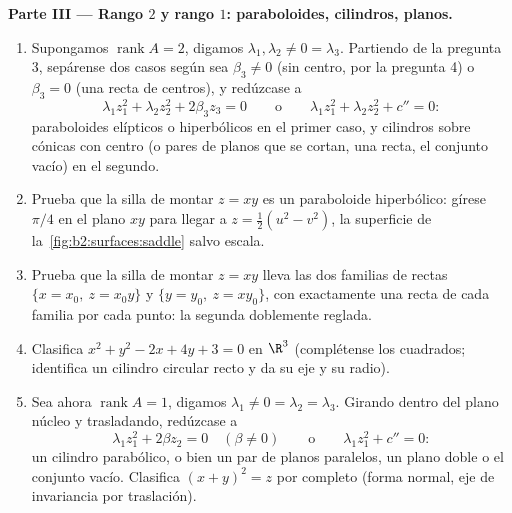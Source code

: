 \begin{problem}
\medskip
\noindent\textbf{Parte III --- Rango $2$ y rango $1$: paraboloides,
cilindros, planos.}
\begin{enumerate}[resume]
  \item Supongamos $\operatorname{rank}A = 2$, digamos $\lambda_1,
        \lambda_2 \neq 0 = \lambda_3$. Partiendo de la pregunta 3,
        sepárense dos casos según sea $\beta_3 \neq 0$ (sin centro,
        por la pregunta 4) o $\beta_3 = 0$ (una recta de centros), y
        redúzcase a
        \[
        \lambda_1z_1^2 + \lambda_2z_2^2 + 2\beta_3z_3 = 0
        \qquad\text{o}\qquad
        \lambda_1z_1^2 + \lambda_2z_2^2 + c'' = 0 :
        \]
        paraboloides elípticos o hiperbólicos en el primer caso, y
        cilindros sobre cónicas con centro (o pares de planos que se
        cortan, una recta, el conjunto vacío) en el segundo.
  \item Prueba que la silla de montar $z = xy$ es un paraboloide
        hiperbólico: gírese $\pi/4$ en el plano $xy$ para llegar a $z
        = \tfrac12(u^2 - v^2)$, la superficie de la~\cref{fig:b2:surfaces:saddle} salvo escala.
  \item Prueba que la silla de montar $z = xy$ lleva las dos familias
        de rectas $\{x = x_0,\ z = x_0y\}$ y $\{y = y_0,\ z =
        xy_0\}$, con exactamente una recta de cada familia por cada
        punto: la segunda  doblemente reglada.
  \item Clasifica $x^2 + y^2 - 2x + 4y + 3 = 0$ en $\R^3$ (complétense
        los cuadrados; identifica un cilindro circular recto y da su
        eje y su radio).
  \item Sea ahora $\operatorname{rank}A = 1$, digamos $\lambda_1 \neq
        0 = \lambda_2 = \lambda_3$. Girando dentro del plano núcleo y
        trasladando, redúzcase a
        \[
        \lambda_1z_1^2 + 2\beta z_2 = 0 \quad (\beta \neq 0)
        \qquad\text{o}\qquad
        \lambda_1z_1^2 + c'' = 0 :
        \]
        un cilindro parabólico, o bien un par de planos paralelos, un
        plano doble o el conjunto vacío. Clasifica $(x + y)^2 = z$
        por completo (forma normal, eje de invariancia por
        traslación).
\end{enumerate}


\end{problem}
